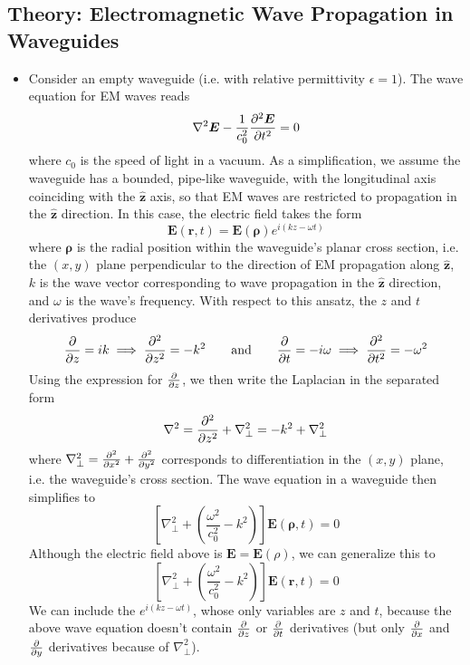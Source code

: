\documentclass[11pt, a4paper]{article}
\newcommand{\eqtext}[1]{\qquad \text{#1} \qquad}
\renewcommand{\vec}[1]{\bm{#1}} %
\newcommand{\uvec}[1]{\hat{\vec{#1}}} %
\renewcommand{\r}{\vec{r}}
\newcommand{\rh}{\vec{\rho}}
\newcommand{\E}{\vec{E}}  %
\newcommand{\e}{\epsilon}
\renewcommand{\laplacian}{\nabla^{2}}
\begin{document}
\subsection{Theory: Electromagnetic Wave Propagation in Waveguides}
\begin{itemize}
	\item Consider an empty waveguide (i.e. with relative permittivity $ \e = 1 $). The wave equation for EM waves reads
	\begin{equation*}
		\laplacian \E - \frac{1}{c_{0}^{2}}\pdv[2]{\E}{t} = 0
	\end{equation*}
	where $ c_{0} $ is the speed of light in a vacuum. As a simplification, we assume the waveguide has a bounded, pipe-like waveguide, with the longitudinal axis coinciding with the $ \uvec{z} $ axis, so that EM waves are restricted to propagation in the $ \uvec{z} $ direction. In this case, the electric field takes the form
	\begin{equation*}
		\E(\r, t) = \E(\rh) e^{i(kz - \omega t)}
	\end{equation*}
	where $ \rh $ is the radial position within the waveguide's planar cross section, i.e. the $ (x, y) $ plane perpendicular to the direction of EM propagation along $ \uvec{z} $, $ k $ is the wave vector corresponding to wave propagation in the $ \uvec{z} $ direction, and $ \omega $ is the wave's frequency. With respect to this ansatz, the $ z $ and $ t $ derivatives produce
	\begin{equation*}
		\pdv{z} = ik \implies \pdv[2]{}{z} = -k^{2} \eqtext{and} \pdv{t} = -i\omega \implies \pdv[2]{}{t} = - \omega^{2}
	\end{equation*}
	Using the expression for $ \pdv{z} $, we then write the Laplacian in the separated form	
	\begin{equation*}
		\laplacian = \pdv[2]{}{z} + \nabla_{\perp}^{2} = -k^{2}  + \nabla_{\perp}^{2}
	\end{equation*}
	where $ \nabla_{\perp}^{2} = \pdv[2]{}{x} + \pdv[2]{}{y} $ corresponds to differentiation in the $ (x, y) $ plane, i.e. the waveguide's cross section. The wave equation in a waveguide then simplifies to 
	\begin{equation*}
		 \left[\nabla_{\perp}^{2} + \left(\frac{\omega^{2}}{c_{0}^{2}} - k^{2}\right)\right]\E(\rh, t) = 0
	\end{equation*}
	Although the electric field above is $ \E = \E(\rho) $, we can generalize this to
	\begin{equation*}
		 \left[\nabla_{\perp}^{2} + \left(\frac{\omega^{2}}{c_{0}^{2}} - k^{2}\right)\right]\E(\r, t) = 0
	\end{equation*}
	We can include the $ e^{i(kz - \omega t)} $, whose only variables are $ z $ and $ t $, because the above wave equation doesn't contain $ \pdv{z} $ or $ \pdv{t} $ derivatives (but only $ \pdv{x} $ and $ \pdv{y} $ derivatives because of $ \laplacian_{\perp} $).
	

\end{itemize}
\end{document}

